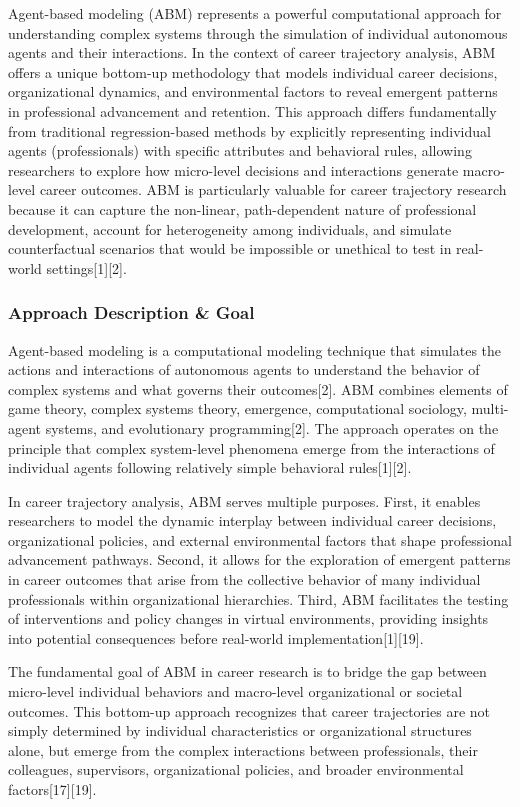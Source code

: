 \documentclass[main.tex]{subfiles}
\begin{document}
Agent-based modeling (ABM) represents a powerful computational approach for understanding complex systems through the simulation of individual autonomous agents and their interactions. In the context of career trajectory analysis, ABM offers a unique bottom-up methodology that models individual career decisions, organizational dynamics, and environmental factors to reveal emergent patterns in professional advancement and retention. This approach differs fundamentally from traditional regression-based methods by explicitly representing individual agents (professionals) with specific attributes and behavioral rules, allowing researchers to explore how micro-level decisions and interactions generate macro-level career outcomes. ABM is particularly valuable for career trajectory research because it can capture the non-linear, path-dependent nature of professional development, account for heterogeneity among individuals, and simulate counterfactual scenarios that would be impossible or unethical to test in real-world settings[1][2].

\subsubsection{Approach Description \& Goal}

Agent-based modeling is a computational modeling technique that simulates the actions and interactions of autonomous agents to understand the behavior of complex systems and what governs their outcomes[2]. ABM combines elements of game theory, complex systems theory, emergence, computational sociology, multi-agent systems, and evolutionary programming[2]. The approach operates on the principle that complex system-level phenomena emerge from the interactions of individual agents following relatively simple behavioral rules[1][2].

In career trajectory analysis, ABM serves multiple purposes. First, it enables researchers to model the dynamic interplay between individual career decisions, organizational policies, and external environmental factors that shape professional advancement pathways. Second, it allows for the exploration of emergent patterns in career outcomes that arise from the collective behavior of many individual professionals within organizational hierarchies. Third, ABM facilitates the testing of interventions and policy changes in virtual environments, providing insights into potential consequences before real-world implementation[1][19].

The fundamental goal of ABM in career research is to bridge the gap between micro-level individual behaviors and macro-level organizational or societal outcomes. This bottom-up approach recognizes that career trajectories are not simply determined by individual characteristics or organizational structures alone, but emerge from the complex interactions between professionals, their colleagues, supervisors, organizational policies, and broader environmental factors[17][19].
\end{document}
